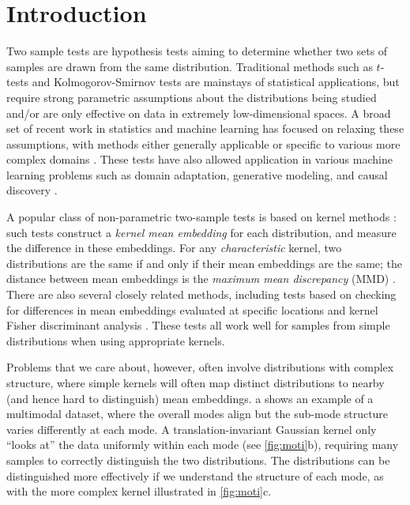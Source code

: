 \documentclass{article}
\begin{document}
\section{Introduction}

Two sample tests are hypothesis tests aiming to determine whether two sets of samples are drawn from the same distribution.
Traditional methods such as $t$-tests and Kolmogorov-Smirnov tests are mainstays of statistical applications,
but require strong parametric assumptions about the distributions being studied
and/or are only effective on data in extremely low-dimensional spaces.
A broad set of
recent work in statistics and machine learning
has focused on relaxing these assumptions,
with methods either generally applicable
or specific to various more complex domains
\citep{Gretton2012,Szekely2013,Heller2016,Jitkrittum2016,RamdasGarciaCuturi,Lopez:C2ST,Chen2017,Gao18neurips,Ghoshdastidar2017,Graph_two_sample,LiW18TIT,Matthias:deep-test}.
These tests have also allowed application in various machine learning problems such as domain adaptation, generative modeling, and causal discovery \citep{MMD_GAN,Gong2016,DA_app_Stojanov,Lopez:C2ST}.

A popular class of
non-parametric two-sample tests is based on kernel methods \citep{smola1998learning}: such tests construct a
\emph{kernel mean embedding} \citep{BerTho04,Muandet2017} for each distribution, and measure the difference in these embeddings.
For any \emph{characteristic} kernel, two distributions are the same if and only if their mean embeddings are the same;
the distance between mean embeddings is the \emph{maximum mean discrepancy} (MMD) \citep{Gretton2012}.
There are also several closely related methods,
including tests based on checking for differences in mean embeddings evaluated at specific locations \citep{Chwialkowski2015,Jitkrittum2016}
and kernel Fisher discriminant analysis \citep{Harchaoui2007}.
These tests all work well for samples from simple distributions when using appropriate kernels.

Problems that we care about, however,
often involve distributions with complex structure,
where simple kernels will often map distinct distributions to nearby (and hence hard to distinguish) mean embeddings.
a shows an example of a multimodal dataset,
where the overall modes align but the sub-mode structure varies differently at each mode.
A translation-invariant Gaussian kernel only ``looks at'' the data uniformly within each mode (see \cref{fig:moti}b),
requiring many samples to correctly distinguish the two distributions.
The distributions can be distinguished more effectively if we understand the structure of each mode,
as with the more complex kernel illustrated in \cref{fig:moti}c.
\end{document}
